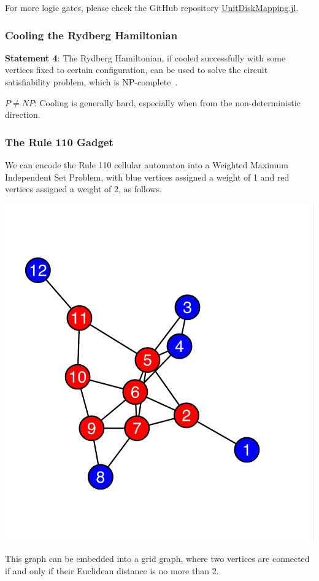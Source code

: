\documentclass[twocolumn,superscriptaddress,english,showpacs,longbibliography]{revtex4-2}
\begin{document}
For more logic gates, please check the GitHub repository
\href{https://github.com/QuEraComputing/UnitDiskMapping.jl/blob/main/test/logicgates.jl}{UnitDiskMapping.jl}.

\subsubsection{Cooling the Rydberg Hamiltonian}\label{cooling-the-rydberg-hamiltonian}

\textbf{Statement 4}: The Rydberg Hamiltonian, if cooled successfully
with some vertices fixed to certain configuration, can be used to solve
the circuit satisfiability problem, which is NP-complete~\cite{Moore2011}.

$P \neq NP$: Cooling is generally hard, especially when from the
non-deterministic direction.

\subsubsection{The Rule 110 Gadget}\label{the-rule-110-gadget}

We can encode the Rule 110 cellular automaton into a Weighted Maximum
Independent Set Problem, with blue vertices assigned a weight of 1 and
red vertices assigned a weight of 2, as follows.

\includegraphics[width=0.6\columnwidth]{../notes/images/image.png}

This graph can be embedded into a grid graph, where two vertices are
connected if and only if their Euclidean distance is no more than $2$.
\end{document}
